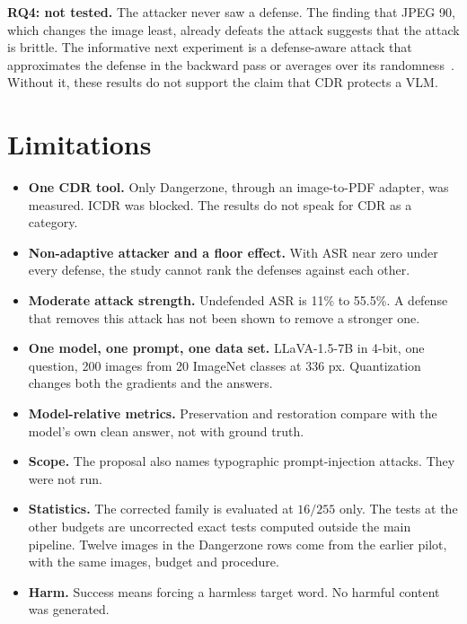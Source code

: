 \documentclass[11pt]{article}
\begin{document}
\textbf{RQ4: not tested.} The attacker never saw a defense. The finding that JPEG 90,
which changes the image least, already defeats the attack suggests that the attack is
brittle. The informative next experiment is a defense-aware
attack that approximates the defense in the backward pass or averages over its
randomness~\cite{athalye2018obfuscated,tramer2020adaptive,carlini2019evaluating}.
Without it, these results do not support the claim that CDR protects a VLM.

\section{Limitations}
\begin{itemize}
\item \textbf{One CDR tool.} Only Dangerzone, through an image-to-PDF adapter, was
measured. ICDR was blocked. The results do not speak for CDR as a category.
\item \textbf{Non-adaptive attacker and a floor effect.} With ASR near zero under every
defense, the study cannot rank the defenses against each other.
\item \textbf{Moderate attack strength.} Undefended ASR is 11\% to 55.5\%. A defense that
removes this attack has not been shown to remove a stronger one.
\item \textbf{One model, one prompt, one data set.} LLaVA-1.5-7B in 4-bit, one question,
200 images from 20 ImageNet classes at 336 px. Quantization changes both the gradients
and the answers.
\item \textbf{Model-relative metrics.} Preservation and restoration compare with the
model's own clean answer, not with ground truth.
\item \textbf{Scope.} The proposal also names typographic prompt-injection attacks.
They were not run.
\item \textbf{Statistics.} The corrected family is evaluated at $16/255$ only. The tests at
the other budgets are uncorrected exact tests computed outside the main pipeline.
Twelve images in the Dangerzone rows come from the earlier pilot, with the same images,
budget and procedure.
\item \textbf{Harm.} Success means forcing a harmless target word. No harmful content
was generated.
\end{itemize}

\end{document}
